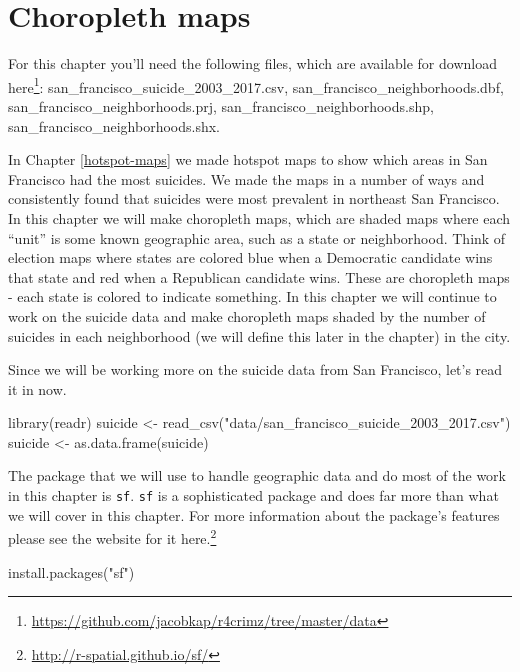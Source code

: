 \documentclass[
  a4paper,
]{krantz}
\makeatletter
\newenvironment{Shaded}{\begin{snugshade}}{\end{snugshade}}
\newcommand{\FunctionTok}[1]{\textcolor[rgb]{0,0,0}{#1}}
\newcommand{\NormalTok}[1]{#1}
\newcommand{\OtherTok}[1]{\textcolor[rgb]{0.37,0.37,0.37}{#1}}
\newcommand{\StringTok}[1]{\textcolor[rgb]{0.5,0.5,0.5}{#1}}
\renewcommand{\href}[2]{#2\footnote{\url{#1}}}
\newenvironment{kframe}{%
\medskip{}
\setlength{\fboxsep}{.8em}
 \def\at@end@of@kframe{}%
 \ifinner\ifhmode%
  \def\at@end@of@kframe{\end{minipage}}%
  \begin{minipage}{\columnwidth}%
 \fi\fi%
 \def\FrameCommand##1{\hskip\@totalleftmargin \hskip-\fboxsep
 \colorbox{shadecolor}{##1}\hskip-\fboxsep
     \hskip-\linewidth \hskip-\@totalleftmargin \hskip\columnwidth}%
 \MakeFramed {\advance\hsize-\width
   \@totalleftmargin\z@ \linewidth\hsize
   \@setminipage}}%
 {\par\unskip\endMakeFramed%
 \at@end@of@kframe}
\renewenvironment{Shaded}{\begin{kframe}}{\end{kframe}}
\makeatother
\begin{document}
\hypertarget{choropleth-maps}{%
\chapter{Choropleth maps}\label{choropleth-maps}}

For this chapter you'll need the following files, which are
available for download
\href{https://github.com/jacobkap/r4crimz/tree/master/data}{here}:
san\_francisco\_suicide\_2003\_2017.csv,
san\_francisco\_neighborhoods.dbf,
san\_francisco\_neighborhoods.prj,
san\_francisco\_neighborhoods.shp,
san\_francisco\_neighborhoods.shx.

In Chapter \ref{hotspot-maps} we made hotspot maps to show
which areas in San Francisco had the most suicides. We made
the maps in a number of ways and consistently found that
suicides were most prevalent in northeast San Francisco. In
this chapter we will make choropleth maps, which are shaded
maps where each ``unit'' is some known geographic area, such
as a state or neighborhood. Think of election maps where
states are colored blue when a Democratic candidate wins
that state and red when a Republican candidate wins. These
are choropleth maps - each state is colored to indicate
something. In this chapter we will continue to work on the
suicide data and make choropleth maps shaded by the number
of suicides in each neighborhood (we will define this later
in the chapter) in the city.

Since we will be working more on the suicide data from San
Francisco, let's read it in now.

\begin{Shaded}
\begin{Highlighting}[]
\FunctionTok{library}\NormalTok{(readr)}
\NormalTok{suicide }\OtherTok{\textless{}{-}} \FunctionTok{read\_csv}\NormalTok{(}\StringTok{"data/san\_francisco\_suicide\_2003\_2017.csv"}\NormalTok{)}
\NormalTok{suicide }\OtherTok{\textless{}{-}} \FunctionTok{as.data.frame}\NormalTok{(suicide)}
\end{Highlighting}
\end{Shaded}

The package that we will use to handle geographic data and
do most of the work in this chapter is \texttt{sf}.
\texttt{sf} is a sophisticated package and does far more
than what we will cover in this chapter. For more
information about the package's features please see the
website for it \href{http://r-spatial.github.io/sf/}{here.}

\begin{Shaded}
\begin{Highlighting}[]
\FunctionTok{install.packages}\NormalTok{(}\StringTok{"sf"}\NormalTok{)}
\end{Highlighting}
\end{Shaded}
\end{document}
